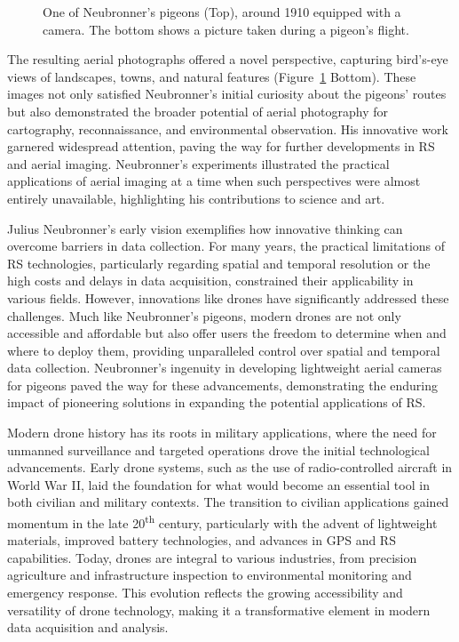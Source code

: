 \documentclass[
  letterpaper,
  11pt,
  english,
  singlespacing,
  headsepline]{MastersDoctoralThesis}
\begin{document}
\begin{spacing}{1.5}
\begin{figure}
{}

\caption{\label{fig-pigeons}One of Neubronner's pigeons (Top), around
1910 equipped with a camera. The bottom shows a picture taken during a
pigeon's flight.}

\end{figure}%

The resulting aerial photographs offered a novel perspective, capturing
bird's-eye views of landscapes, towns, and natural features
(Figure~\ref{fig-pigeons} Bottom). These images not only satisfied
Neubronner's initial curiosity about the pigeons' routes but also
demonstrated the broader potential of aerial photography for
cartography, reconnaissance, and environmental observation. His
innovative work garnered widespread attention, paving the way for
further developments in RS and aerial imaging. Neubronner's experiments
illustrated the practical applications of aerial imaging at a time when
such perspectives were almost entirely unavailable, highlighting his
contributions to science and art.

Julius Neubronner's early vision exemplifies how innovative thinking can
overcome barriers in data collection. For many years, the practical
limitations of RS technologies, particularly regarding spatial and
temporal resolution or the high costs and delays in data acquisition,
constrained their applicability in various fields. However, innovations
like drones have significantly addressed these challenges. Much like
Neubronner's pigeons, modern drones are not only accessible and
affordable but also offer users the freedom to determine when and where
to deploy them, providing unparalleled control over spatial and temporal
data collection. Neubronner's ingenuity in developing lightweight aerial
cameras for pigeons paved the way for these advancements, demonstrating
the enduring impact of pioneering solutions in expanding the potential
applications of RS.

Modern drone history has its roots in military applications, where the
need for unmanned surveillance and targeted operations drove the initial
technological advancements. Early drone systems, such as the use of
radio-controlled aircraft in World War II, laid the foundation for what
would become an essential tool in both civilian and military contexts.
The transition to civilian applications gained momentum in the late
20\textsuperscript{th} century, particularly with the advent of
lightweight materials, improved battery technologies, and advances in
GPS and RS capabilities. Today, drones are integral to various
industries, from precision agriculture and infrastructure inspection to
environmental monitoring and emergency response. This evolution reflects
the growing accessibility and versatility of drone technology, making it
a transformative element in modern data acquisition and analysis.


\end{spacing}
\end{document}
